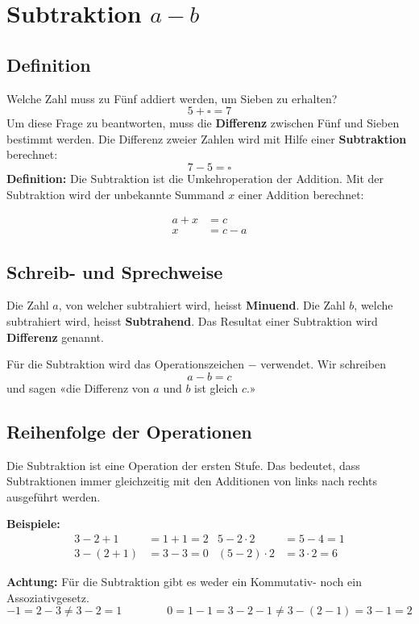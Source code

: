 \newpage
\section{Subtraktion $a-b$}

\subsection{Definition}

Welche Zahl muss zu Fünf addiert werden, um Sieben zu erhalten?
\[
  5 + \square = 7
\]
Um diese Frage zu beantworten, muss die \textbf{Differenz} zwischen Fünf und Sieben bestimmt werden. Die Differenz zweier Zahlen wird mit Hilfe einer \textbf{Subtraktion} berechnet:
\[
  7 - 5 = \square
\]
\textbf{Definition:} Die Subtraktion ist die Umkehroperation der Addition. Mit der Subtraktion wird der unbekannte Summand $x$ einer Addition berechnet:

\begin{align*}
  a+x &= c \\
    x &= c-a
\end{align*}

\subsection{Schreib- und Sprechweise}

Die Zahl $a$, von welcher subtrahiert wird, heisst \textbf{Minuend}. Die Zahl $b$, welche subtrahiert wird, heisst \textbf{Subtrahend}. Das Resultat einer Subtraktion wird \textbf{Differenz} genannt.

Für die Subtraktion wird das Operationszeichen $-$ verwendet. Wir schreiben
\[
  a - b = c
\]
und sagen «die Differenz von $a$ und $b$ ist gleich $c$.»

\subsection{Reihenfolge der Operationen}

Die Subtraktion ist eine Operation der ersten Stufe. Das bedeutet, dass Subtraktionen immer gleichzeitig mit den Additionen von links nach rechts ausgeführt werden.

\begin{example}
  \textbf{Beispiele:}
  \begin{align*}
      3-2+1 &= 1+1 = 2 &   5-2\cdot 2 &= 5-4 = 1 \\
    3-(2+1) &= 3-3 = 0 & (5-2)\cdot 2 &= 3\cdot 2 = 6
  \end{align*}
\end{example}

\begin{note}
  \textbf{Achtung:} Für die Subtraktion gibt es weder ein Kommutativ- noch ein Assoziativgesetz.
  \[
    -1 = 2-3 \ne 3-2 = 1 \qquad\qquad 0 = 1-1 = 3-2-1 \ne 3-(2-1) = 3-1 = 2
  \]
\end{note}
